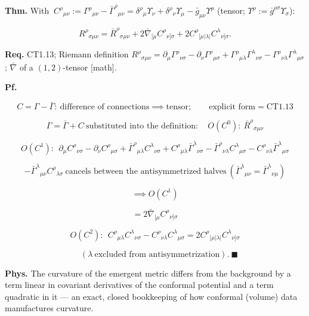 \begin{theorem}\label{tag:CT1-14}
\textbf{Thm.} With $\ C^\rho{}_{\mu\nu}:=\Gamma^\rho{}_{\mu\nu}-\bar\Gamma^\rho{}_{\mu\nu}=\delta^\rho{}_\mu\Upsilon_\nu+\delta^\rho{}_\nu\Upsilon_\mu-\bar g_{\mu\nu}\Upsilon^\rho$ (tensor; $\Upsilon^\rho:=\bar g^{\rho\sigma}\Upsilon_\sigma$):

\[
R^\rho{}_{\sigma\mu\nu}=\bar R^\rho{}_{\sigma\mu\nu}+2\bar\nabla_{[\mu}C^\rho{}_{\nu]\sigma}+2C^\rho{}_{[\mu|\lambda|}C^\lambda{}_{\nu]\sigma}.
\]

\textbf{Req.} CT1.13; Riemann definition $R^\rho{}_{\sigma\mu\nu}=\partial_\mu\Gamma^\rho{}_{\nu\sigma}-\partial_\nu\Gamma^\rho{}_{\mu\sigma}+\Gamma^\rho{}_{\mu\lambda}\Gamma^\lambda{}_{\nu\sigma}-\Gamma^\rho{}_{\nu\lambda}\Gamma^\lambda{}_{\mu\sigma}$; $\bar\nabla$ of a $(1,2)$-tensor [math].

\textbf{Pf.}

\[
C=\Gamma-\bar\Gamma:\ \text{difference of connections}\implies\text{tensor};\qquad\text{explicit form}=\mathrm{CT1.13}
\]

\[
\Gamma=\bar\Gamma+C\ \text{substituted into the definition}:\quad
O(C^0):\ \bar R^\rho{}_{\sigma\mu\nu}
\]

\[
O(C^1):\ \ \partial_\mu C^\rho{}_{\nu\sigma}-\partial_\nu C^\rho{}_{\mu\sigma}+\bar\Gamma^\rho{}_{\mu\lambda}C^\lambda{}_{\nu\sigma}+C^\rho{}_{\mu\lambda}\bar\Gamma^\lambda{}_{\nu\sigma}-\bar\Gamma^\rho{}_{\nu\lambda}C^\lambda{}_{\mu\sigma}-C^\rho{}_{\nu\lambda}\bar\Gamma^\lambda{}_{\mu\sigma}
\]

\[
-\bar\Gamma^\lambda{}_{\mu\nu}C^\rho{}_{\lambda\sigma}\ \text{cancels between the antisymmetrized halves}\ (\bar\Gamma^\lambda{}_{\mu\nu}=\bar\Gamma^\lambda{}_{\nu\mu})
\]

\[
\implies O(C^1)
\]

\[
= 2\bar\nabla_{[\mu}C^\rho{}_{\nu]\sigma}
\]

\[
O(C^2):\ \ C^\rho{}_{\mu\lambda}C^\lambda{}_{\nu\sigma}-C^\rho{}_{\nu\lambda}C^\lambda{}_{\mu\sigma}=2C^\rho{}_{[\mu|\lambda|}C^\lambda{}_{\nu]\sigma}
\]

\[
\quad (\lambda\ \text{excluded from antisymmetrization}).\ \blacksquare
\]

\textbf{Phys.} The curvature of the emergent metric differs from the background by a term linear in covariant derivatives of the conformal potential and a term quadratic in it — an exact, closed bookkeeping of how conformal (volume) data manufactures curvature.

\end{theorem}

